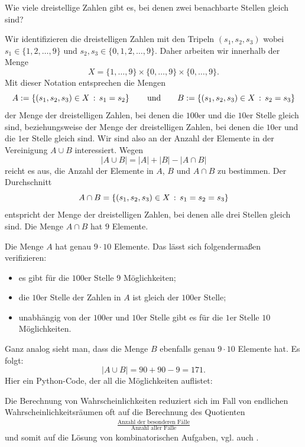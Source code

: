 \begin{bsp}
	Wie viele dreistellige Zahlen gibt es, bei denen zwei benachbarte Stellen gleich sind? 
	
	Wir identifizieren die dreistelligen Zahlen mit den Tripeln $(s_1,s_2,s_3)$ wobei $s_1 \in \{1,2,\ldots,9\}$ und $s_2,s_3 \in \{0,1,2,\ldots,9\}$. Daher arbeiten wir innerhalb der Menge
	\[
			X = \{1,\ldots,9\} \times  \{0,\ldots,9\} \times \{0,\ldots,9\}.
	\]
	Mit dieser Notation entsprechen die Mengen
	\[
		A := \left\{  (s_1,s_2,s_3) \in X \,:\, s_1=s_2 \right\} \qquad \textrm{und} \qquad B:= \left\{  (s_1,s_2,s_3) \in X \,:\, s_2=s_3 \right\}
	\]
	der Menge der dreistelligen Zahlen, bei denen die $100$er und die $10$er Stelle gleich sind, beziehungsweise der Menge der dreistelligen Zahlen, bei denen die $10$er und die $1$er Stelle gleich sind. Wir sind also an der Anzahl der Elemente in der Vereinigung $A \cup B$ interessiert. Wegen 
	\[
			| A \cup B| = |A| + |B|  - |A \cap B|
	\]
	reicht es aus, die Anzahl der Elemente in $A$, $B$ und $A \cap B$ zu bestimmen. 	
	Der Durchschnitt 
	\[	
		A \cap B = \left\{  (s_1,s_2,s_3) \in X \,:\, s_1=s_2=s_3 \right\}
	\]
	entspricht der Menge der dreistelligen Zahlen, bei denen alle drei Stellen gleich sind. Die Menge $A\cap B$ hat $9$ Elemente.
	
	Die Menge $A$ hat genau $9 \cdot 10$ Elemente. Das lässt sich folgendermaßen verifizieren:  
	\begin{itemize} 
		\item es gibt für die $100$er Stelle $9$ Möglichkeiten;
		\item die $10$er Stelle der Zahlen in $A$ ist gleich der $100$er Stelle;
		\item unabhängig von der $100$er und $10$er Stelle gibt es für die $1$er Stelle $10$ Möglichkeiten.
	\end{itemize} 
	Ganz analog sieht man, dass die Menge $B$ ebenfalls genau $9 \cdot 10$ Elemente hat. Es folgt: 
	\[
		|A \cup B| = 90 + 90 - 9 = 171. 
	\]	
	Hier ein Python-Code, der all die Möglichkeiten auflistet: 
	
\end{bsp} 

\begin{bem} 
	Die Berechnung von Wahrscheinlichkeiten reduziert sich im Fall von endlichen Wahrscheinlichkeitsräumen oft auf die Berechnung des Quotienten 
	\begin{align*}
			\frac{\text{Anzahl der besonderen Fälle}}{\text{Anzahl aller Fälle}}
	\end{align*} 
	und somit auf die Lösung von kombinatorischen Aufgaben, vgl. auch \cite{Tit19}. 
\end{bem} 


